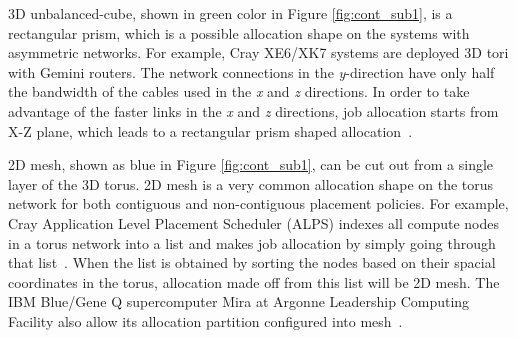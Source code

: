 3D unbalanced-cube, shown in green color in Figure \ref{fig:cont_sub1}, 
is a rectangular prism, which is a possible allocation shape 
on the systems with asymmetric networks. 
For example, Cray XE6/XK7 systems are deployed 3D tori with Gemini routers. 
The network connections in the \emph{y}-direction have 
only half the bandwidth of the cables used in the \emph{x} and \emph{z} directions. 
In order to take advantage of the faster links in the \emph{x} and \emph{z} directions, 
job allocation starts from X-Z plane, 
which leads to a rectangular prism shaped allocation~\cite{RF}.

2D mesh, shown as blue in Figure \ref{fig:cont_sub1}, 
can be cut out from a single layer of the 3D torus. 
2D mesh is a very common allocation shape on the torus network 
for both contiguous and non-contiguous placement policies. 
For example, Cray Application Level Placement Scheduler (ALPS) indexes 
all compute nodes in a torus network into a list and 
makes job allocation by simply going through that list~\cite{carl-cug}. 
When the list is obtained by sorting the nodes based on 
their spacial coordinates in the torus, 
allocation made off from this list will be 2D mesh. 
The IBM Blue/Gene Q supercomputer Mira at Argonne Leadership Computing Facility 
also allow its allocation partition configured into mesh~\cite{zhou-ipdps}. 

